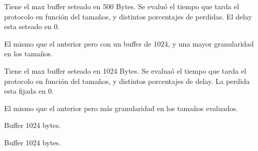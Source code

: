 Tiene el max buffer seteado en 500 Bytes. Se evalu\'o el tiempo que tarda el protocolo en funci\'on del tama\~nos, y distintos porcentajes de perdidas. El delay esta seteado en 0. 

El mismo que el anterior pero con un buffer de 1024, y una mayor granularidad en los tama\~nos.

Tiene el max buffer seteado en 1024 Bytes. Se evalua\'o el tiempo que tarda el protocolo en funci\'on del tama\~nos, y distintos porcentajes de delay. La perdida esta fijada en 0. 

El mismo que el anterior pero m\'as granularidad en los tama\~nos evaluados.

Buffer 1024 bytes. 

Buffer 1024 bytes.